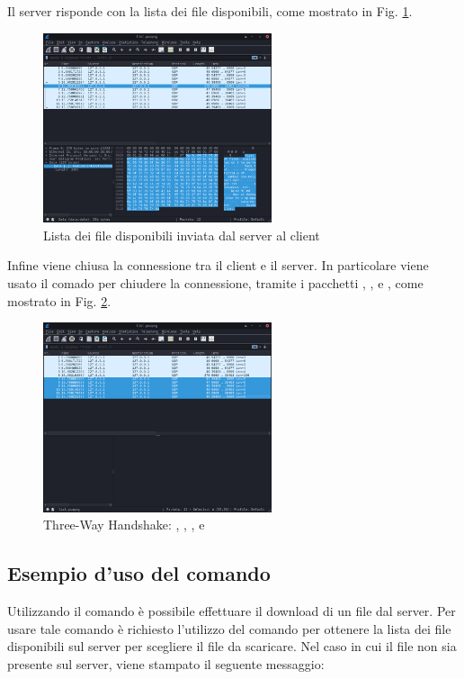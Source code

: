 Il server risponde con la lista dei file disponibili, come mostrato in Fig. \ref{fig:list}.

\begin{figure}[h]
    \centering
    \includegraphics[width=0.6\textwidth]{imgs/03/list-cmd.png}
    \caption{Lista dei file disponibili inviata dal server al client}
    \label{fig:list}
\end{figure}

Infine viene chiusa la connessione tra il client e il server.
In particolare viene usato il comado  per chiudere la connessione, tramite i pacchetti , ,  e , come mostrato in Fig. \ref{fig:fin-finack-ack}.

\begin{figure}[h]
    \centering
    \includegraphics[width=0.6\textwidth]{imgs/03/close-CLOSE-fin-finack-fin-finack.png}
    \caption{Three-Way Handshake: , , ,  e }
    \label{fig:fin-finack-ack}
\end{figure}

\subsection{Esempio d'uso del comando }
Utilizzando il comando  è possibile effettuare il download di un file dal server.
Per usare tale comando è richiesto l'utilizzo del comando  per ottenere la lista dei file disponibili sul server per scegliere il file da scaricare.
Nel caso in cui il file non sia presente sul server, viene stampato il seguente messaggio:

